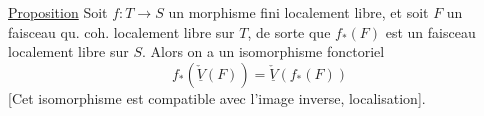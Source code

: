 \uline{Proposition} Soit $f:T\to S$ un morphisme fini localement libre, et soit  $F$ un faisceau qu. coh. localement libre sur $T$, de sorte que $f_*(F)$ est un faisceau  localement libre sur $S$. Alors on a un isomorphisme fonctoriel
\[
\boxed{f_*(\underline{\check V}(F))=\underline{\check V}(f_*(F))}
\]
[Cet isomorphisme est compatible avec l’image inverse,  localisation].
